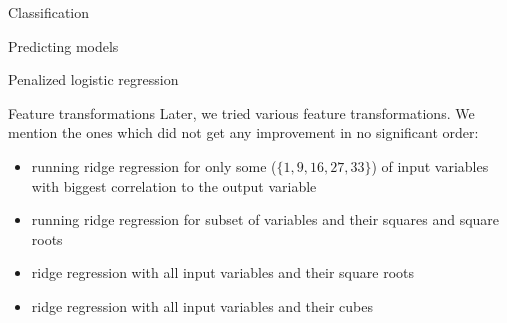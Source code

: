 \documentclass{article}
\begin{document}
\begin{section}{Classification}
\begin{subsection}{Predicting models}
\begin{subsubsection}{Penalized logistic regression}
\begin{figure}[!t]
\hfill
{}
\caption{}
\end{figure}

\begin{subsubsection}{Feature transformations}
Later, we tried various feature transformations. We mention the ones which did not get any improvement in no significant order:
\begin{itemize}

\item running ridge regression for only some ($\{1, 9, 16, 27, 33\}$) of input variables with biggest correlation to the output variable
\item running ridge regression for subset of variables and their squares and square roots
\item ridge regression with all input variables and their square roots
\item ridge regression with all input variables and their cubes
\end{itemize}


\end{subsubsection}
\end{subsubsection}
\end{subsection}
\end{section}
\end{document}
